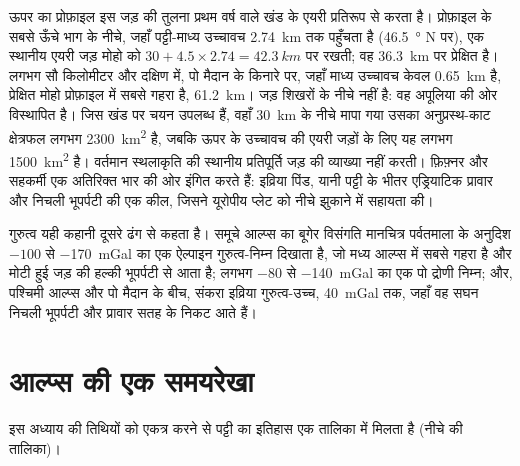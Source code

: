 ऊपर का प्रोफ़ाइल इस जड़ की तुलना प्रथम वर्ष वाले
खंड के एयरी प्रतिरूप से करता है। प्रोफ़ाइल के सबसे ऊँचे भाग के नीचे, जहाँ पट्टी-माध्य उच्चावच
\qty{2.74}{km} तक पहुँचता है (\qty{46.5}{\degree} N पर), एक स्थानीय एयरी जड़ मोहो को
$30 + 4.5 \times 2.74 = \qty{42.3}{km}$ पर रखती; वह \qty{36.3}{km} पर प्रेक्षित है। लगभग सौ
किलोमीटर और दक्षिण में, पो मैदान के किनारे पर, जहाँ माध्य उच्चावच केवल
\qty{0.65}{km} है, प्रेक्षित मोहो प्रोफ़ाइल में सबसे गहरा है, \qty{61.2}{km}। जड़ शिखरों के नीचे नहीं है: वह
अपूलिया की ओर विस्थापित है। जिस खंड पर चयन उपलब्ध हैं, वहाँ \qty{30}{km} के नीचे मापा गया
उसका अनुप्रस्थ-काट क्षेत्रफल लगभग \qty{2300}{km^2} है, जबकि ऊपर के उच्चावच की एयरी
जड़ों के लिए यह लगभग \qty{1500}{km^2} है। वर्तमान स्थलाकृति की स्थानीय प्रतिपूर्ति
जड़ की व्याख्या नहीं करती। फ़िफ़्नर और सहकर्मी एक अतिरिक्त भार की ओर इंगित करते हैं: इव्रिया पिंड, यानी पट्टी के भीतर
एड्रियाटिक प्रावार और निचली भूपर्पटी की एक कील, जिसने यूरोपीय प्लेट को नीचे झुकाने में
सहायता की।

गुरुत्व यही कहानी दूसरे ढंग से कहता है। समूचे आल्प्स का बूगेर विसंगति मानचित्र पर्वतमाला के अनुदिश
$-100$ से \qty{-170}{mGal} का एक ऐल्पाइन गुरुत्व-निम्न दिखाता है, जो मध्य
आल्प्स में सबसे गहरा है और मोटी हुई जड़ की हल्की भूपर्पटी से आता है; लगभग $-80$ से
\qty{-140}{mGal} का एक पो द्रोणी निम्न; और, पश्चिमी आल्प्स और पो मैदान के बीच, संकरा इव्रिया गुरुत्व-उच्च,
\qty{+40}{mGal} तक, जहाँ वह सघन निचली भूपर्पटी और प्रावार
सतह के निकट आते हैं।

\section{आल्प्स की एक समयरेखा}\label{sec:b2:alpine-orogen:timeline}

इस अध्याय की तिथियों को एकत्र करने से पट्टी का इतिहास एक तालिका में मिलता है
(नीचे की तालिका)।

